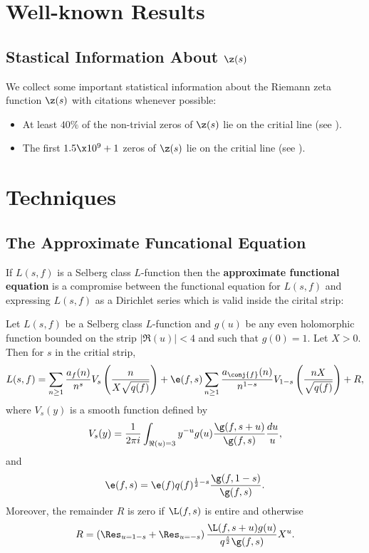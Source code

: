   \chapter{Well-known Results}
    \section{Stastical Information About \texorpdfstring{$\z(s)$}{z(s)}}
      We collect some important statistical information about the Riemann zeta function $\z(s)$ with citations whenever possible:
      \begin{itemize}
        \item At least $40\%$ of the non-trivial zeros of $\z(s)$ lie on the critial line (see \cite{conrey1989more}).
        \item The first $1.5 \x 10^{9}+1$ zeros of $\z(s)$ lie on the critial line (see \cite{van1986zeros}).
      \end{itemize}
  \chapter{Techniques}
    \section{The Approximate Funcational Equation}
      If $L(s,f)$ is a Selberg class $L$-function then the \textbf{approximate functional equation} is a compromise between the functional equation for $L(s,f)$ and expressing $L(s,f)$ as a Dirichlet series which is valid inside the cirital strip:

      \begin{theorem}
        Let $L(s,f)$ be a Selberg class $L$-function and $g(u)$ be any even holomorphic function bounded on the strip $|\Re(u)| < 4$ and such that $g(0) = 1$. Let $X > 0$. Then for $s$ in the critial strip,
        \[
          L(s,f) = \sum_{n \ge 1}\frac{a_{f}(n)}{n^{s}}V_{s}\left(\frac{n}{X\sqrt{q(f)}}\right)+\e(f,s)\sum_{n \ge 1}\frac{a_{\conj{f}}(n)}{n^{1-s}}V_{1-s}\left(\frac{nX}{\sqrt{q(f)}}\right)+R,
        \]
        where $V_{s}(y)$ is a smooth function defined by
        \[
          V_{s}(y) = \frac{1}{2\pi i}\int_{\Re(u) = 3}y^{-u}g(u)\frac{\g(f,s+u)}{\g(f,s)}\frac{du}{u},
        \]
        and
        \[
          \e(f,s) = \e(f)q(f)^{\frac{1}{2}-s}\frac{\g(f,1-s)}{\g(f,s)}.
        \]
        Moreover, the remainder $R$ is zero if $\L(f,s)$ is entire and otherwise
        \[
          R = \left(\Res_{u = 1-s}+\Res_{u = -s}\right)\frac{\L(f,s+u)g(u)}{q^{\frac{s}{2}}\g(f,s)}X^{u}.
        \]
      \end{theorem}

